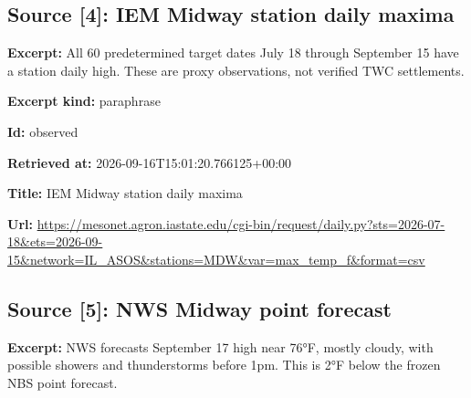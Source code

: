 \documentclass[11pt]{article}
\begin{document}
\subsection*{\textcolor{epdarkgreen}{Source [4]: IEM Midway station daily maxima}}
\par\noindent\textbf{Excerpt:} All 60 predetermined target dates July 18 through September 15 have a station daily high. These are proxy observations, not verified TWC settlements.

\par\noindent\textbf{Excerpt kind:} paraphrase

\par\noindent\textbf{Id:} observed

\par\noindent\textbf{Retrieved at:} 2026-09-16T1\hspace{0pt}5:01:20.7661\hspace{0pt}25+00:00

\par\noindent\textbf{Title:} IEM Midway station daily maxima

\par\noindent\textbf{Url:} \href{https://mesonet.agron.iastate.edu/cgi-bin/request/daily.py?sts=2026-07-18\&ets=2026-09-15\&network=IL\_ASOS\&stations=MDW\&var=max\_temp\_f\&format=csv}{https://meso\hspace{0pt}net.agron.ia\hspace{0pt}state.edu/cg\hspace{0pt}i-bin/reques\hspace{0pt}t/daily.py?s\hspace{0pt}ts=2026-07-1\hspace{0pt}8\&ets=2026-0\hspace{0pt}9-15\&network\hspace{0pt}=IL\_ASOS\&sta\hspace{0pt}tions=MDW\&va\hspace{0pt}r=max\_temp\_f\hspace{0pt}\&format=csv}

\subsection*{\textcolor{epdarkgreen}{Source [5]: NWS Midway point forecast}}
\par\noindent\textbf{Excerpt:} NWS forecasts September 17 high near 76°F, mostly cloudy, with possible showers and thunderstorms before 1pm. This is 2°F below the frozen NBS point forecast.
\end{document}
